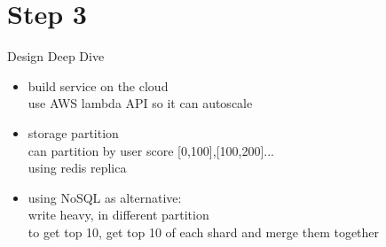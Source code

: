 \documentclass{article}
\begin{document}
\section{Step 3}
Design Deep Dive\\
\begin{itemize}
    \item build service on the cloud\\
    use AWS lambda API so it can autoscale\\
    \item storage partition\\
    can partition by user score [0,100],[100,200]...\\
    using redis replica\\
    \item using NoSQL as alternative:\\
    write heavy, in different partition\\
    to get top 10, get top 10 of each shard and merge them together\\
\end{itemize}
\end{document}
